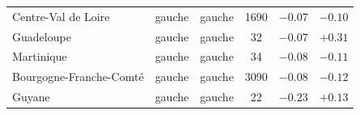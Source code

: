 \documentclass[11pt,a4paper]{article}
\begin{document}
\begin{table}[H]
\begin{tabular}{@{}lccccr@{}}
Centre-Val de Loire            & gauche       & gauche       &  1690 & $-0.07$ & $-0.10$ \\
Guadeloupe                     & gauche       & gauche       &    32 & $-0.07$ & $+0.31$ \\
Martinique                     & gauche       & gauche       &    34 & $-0.08$ & $-0.11$ \\
Bourgogne-Franche-Comt\'e      & gauche       & gauche       &  3090 & $-0.08$ & $-0.12$ \\
Guyane                         & gauche       & gauche       &    22 & $-0.23$ & $+0.13$ \\
\bottomrule
\end{tabular}
\end{table}


\end{document}
